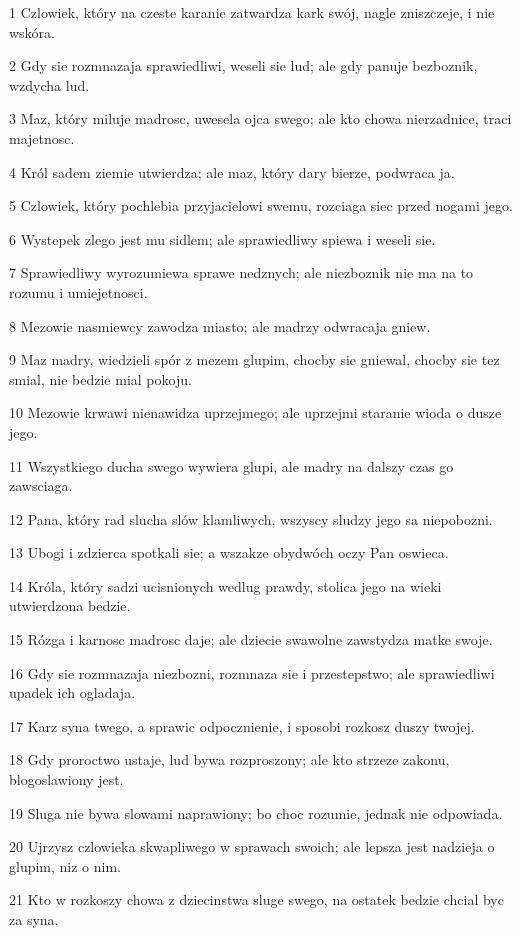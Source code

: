 \par 1 Czlowiek, który na czeste karanie zatwardza kark swój, nagle zniszczeje, i nie wskóra.
\par 2 Gdy sie rozmnazaja sprawiedliwi, weseli sie lud; ale gdy panuje bezboznik, wzdycha lud.
\par 3 Maz, który miluje madrosc, uwesela ojca swego; ale kto chowa nierzadnice, traci majetnosc.
\par 4 Król sadem ziemie utwierdza; ale maz, który dary bierze, podwraca ja.
\par 5 Czlowiek, który pochlebia przyjacielowi swemu, rozciaga siec przed nogami jego.
\par 6 Wystepek zlego jest mu sidlem; ale sprawiedliwy spiewa i weseli sie.
\par 7 Sprawiedliwy wyrozumiewa sprawe nedznych; ale niezboznik nie ma na to rozumu i umiejetnosci.
\par 8 Mezowie nasmiewcy zawodza miasto; ale madrzy odwracaja gniew.
\par 9 Maz madry, wiedzieli spór z mezem glupim, chocby sie gniewal, chocby sie tez smial, nie bedzie mial pokoju.
\par 10 Mezowie krwawi nienawidza uprzejmego; ale uprzejmi staranie wioda o dusze jego.
\par 11 Wszystkiego ducha swego wywiera glupi, ale madry na dalszy czas go zawsciaga.
\par 12 Pana, który rad slucha slów klamliwych, wszyscy sludzy jego sa niepobozni.
\par 13 Ubogi i zdzierca spotkali sie; a wszakze obydwóch oczy Pan oswieca.
\par 14 Króla, który sadzi ucisnionych wedlug prawdy, stolica jego na wieki utwierdzona bedzie.
\par 15 Rózga i karnosc madrosc daje; ale dziecie swawolne zawstydza matke swoje.
\par 16 Gdy sie rozmnazaja niezbozni, rozmnaza sie i przestepstwo; ale sprawiedliwi upadek ich ogladaja.
\par 17 Karz syna twego, a sprawic odpocznienie, i sposobi rozkosz duszy twojej.
\par 18 Gdy proroctwo ustaje, lud bywa rozproszony; ale kto strzeze zakonu, blogoslawiony jest.
\par 19 Sluga nie bywa slowami naprawiony; bo choc rozumie, jednak nie odpowiada.
\par 20 Ujrzysz czlowieka skwapliwego w sprawach swoich; ale lepsza jest nadzieja o glupim, niz o nim.
\par 21 Kto w rozkoszy chowa z dziecinstwa sluge swego, na ostatek bedzie chcial byc za syna.
